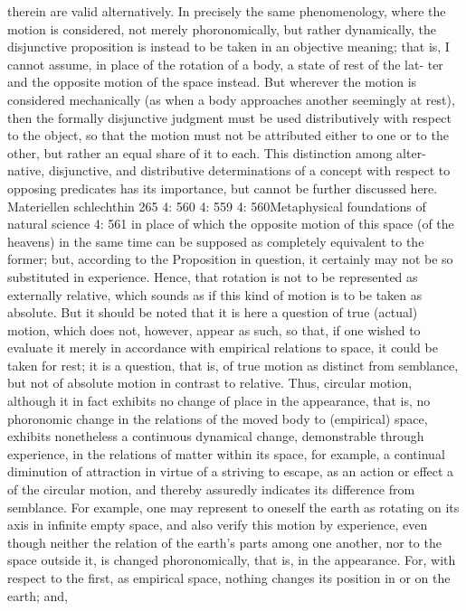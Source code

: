 therein are valid alternatively. In precisely the same phenomenology, where the
motion is considered, not merely phoronomically, but rather dynamically, the
disjunctive proposition is instead to be taken in an objective meaning; that is,
I cannot assume, in place of the rotation of a body, a state of rest of the lat-
ter and the opposite motion of the space instead. But wherever the motion is
considered mechanically (as when a body approaches another seemingly at rest),
then the formally disjunctive judgment must be used distributively with respect
to the object, so that the motion must not be attributed either to one or to the
other, but rather an equal share of it to each. This distinction among alter-
native, disjunctive, and distributive determinations of a concept with respect to
opposing predicates has its importance, but cannot be further discussed here.
Materiellen
schlechthin
265
4: 560
4: 559
4: 560Metaphysical foundations of natural science
4: 561
in place of which the opposite motion of this space (of the heavens) in
the same time can be supposed as completely equivalent to the former;
but, according to the Proposition in question, it certainly may not be so
substituted in experience. Hence, that rotation is not to be represented
as externally relative, which sounds as if this kind of motion is to be taken
as absolute.
But it should be noted that it is here a question of true (actual) motion,
which does not, however, appear as such, so that, if one wished to evaluate
it merely in accordance with empirical relations to space, it could be taken
for rest; it is a question, that is, of true motion as distinct from semblance,
but not of absolute motion in contrast to relative. Thus, circular motion,
although it in fact exhibits no change of place in the appearance, that is,
no phoronomic change in the relations of the moved body to (empirical)
space, exhibits nonetheless a continuous dynamical change, demonstrable
through experience, in the relations of matter within its space, for example,
a continual diminution of attraction in virtue of a striving to escape,
as an action or effect a of the circular motion, and thereby assuredly
indicates its difference from semblance. For example, one may represent
to oneself the earth as rotating on its axis in inﬁnite empty space, and also
verify this motion by experience, even though neither the relation of the
earth’s parts among one another, nor to the space outside it, is changed
phoronomically, that is, in the appearance. For, with respect to the ﬁrst,
as empirical space, nothing changes its position in or on the earth; and,
